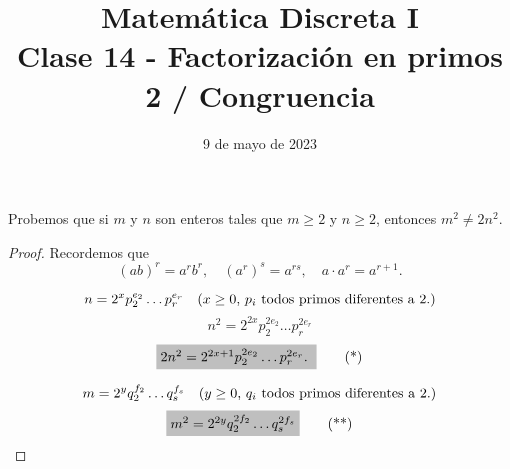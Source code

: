 \documentclass[handout]{beamer} %
\title[Clase 14 - Factorización en primos]{Matemática Discreta I \\ Clase 14 - Factorización en primos 2 / Congruencia}
\institute[]{\normalsize FAMAF / UNC
    \\[\baselineskip] ${}^{}$
    \\[\baselineskip]
}
\date[09/05/2023]{9 de mayo de 2023}
\begin{document}
    
    \frame{\titlepage} 
    
    
    \begin{frame}
        
        \begin{ejemplo} Probemos que si $m$ y $n$ son enteros tales que
            $m\ge 2$ y $n\ge 2$, entonces $m^2 \not=2n^2$.
        \end{ejemplo}\pause
        \begin{proof} \pause

        Recordemos que
        $$
        (ab)^r = a^rb^r, \quad (a^r)^s = a^{r s}, \quad  a\cdot a^r = a^{r+1}. 
        $$    


            $$ n = 2^{x}p_2^{e_2}\ldots p_r^{e_r}\text{\quad ($x \ge 0$, $p_i$ todos primos diferentes a 2.)} $$
            $$ n^2 = 2^{2x}p_2^{2e_2}\ldots p_r^{2e_r}$$
            \begin{equation}
                \colorbox{lightgray}{$2n^2= 2^{2x+1}p_2^{2e_2}\ldots p_r^{2e_r}.$ }\tag{*}
            \end{equation}
            
            $$
            m = 2^{y}q_2^{f_2}\ldots q_s^{f_s}\text{\quad ($y \ge 0$, $q_i$ todos primos diferentes a 2.)}
            $$
            \begin{equation}
                \colorbox{lightgray}{$m^2 = 2^{2y}q_2^{2f_2}\ldots q_s^{2f_s}$} \tag{**}
            \end{equation}
            
        \end{proof}
        
    \end{frame}
    
\end{document}

